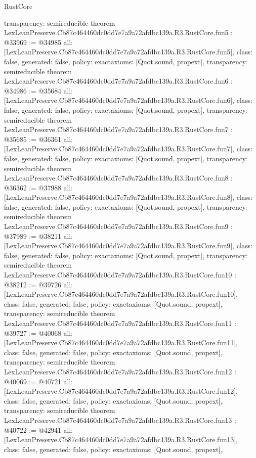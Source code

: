 \begin{lexlean}{RustCore}
\begin{coremodule}
{  transparency: semireducible
}
theorem LexLeanPreserve.Cb87c464460dc0dd7e7a9a72afdbc139a.R3.RustCore.fun5 : @33969 := @34985 {
  all: [LexLeanPreserve.Cb87c464460dc0dd7e7a9a72afdbc139a.R3.RustCore.fun5],
  class: false,
  generated: false,
  policy: exact{axioms: [Quot.sound, propext]},
  transparency: semireducible
}
theorem LexLeanPreserve.Cb87c464460dc0dd7e7a9a72afdbc139a.R3.RustCore.fun6 : @34986 := @35684 {
  all: [LexLeanPreserve.Cb87c464460dc0dd7e7a9a72afdbc139a.R3.RustCore.fun6],
  class: false,
  generated: false,
  policy: exact{axioms: [Quot.sound, propext]},
  transparency: semireducible
}
theorem LexLeanPreserve.Cb87c464460dc0dd7e7a9a72afdbc139a.R3.RustCore.fun7 : @35685 := @36361 {
  all: [LexLeanPreserve.Cb87c464460dc0dd7e7a9a72afdbc139a.R3.RustCore.fun7],
  class: false,
  generated: false,
  policy: exact{axioms: [Quot.sound, propext]},
  transparency: semireducible
}
theorem LexLeanPreserve.Cb87c464460dc0dd7e7a9a72afdbc139a.R3.RustCore.fun8 : @36362 := @37988 {
  all: [LexLeanPreserve.Cb87c464460dc0dd7e7a9a72afdbc139a.R3.RustCore.fun8],
  class: false,
  generated: false,
  policy: exact{axioms: [Quot.sound, propext]},
  transparency: semireducible
}
theorem LexLeanPreserve.Cb87c464460dc0dd7e7a9a72afdbc139a.R3.RustCore.fun9 : @37989 := @38211 {
  all: [LexLeanPreserve.Cb87c464460dc0dd7e7a9a72afdbc139a.R3.RustCore.fun9],
  class: false,
  generated: false,
  policy: exact{axioms: [Quot.sound, propext]},
  transparency: semireducible
}
theorem LexLeanPreserve.Cb87c464460dc0dd7e7a9a72afdbc139a.R3.RustCore.fun10 : @38212 := @39726 {
  all: [LexLeanPreserve.Cb87c464460dc0dd7e7a9a72afdbc139a.R3.RustCore.fun10],
  class: false,
  generated: false,
  policy: exact{axioms: [Quot.sound, propext]},
  transparency: semireducible
}
theorem LexLeanPreserve.Cb87c464460dc0dd7e7a9a72afdbc139a.R3.RustCore.fun11 : @39727 := @40068 {
  all: [LexLeanPreserve.Cb87c464460dc0dd7e7a9a72afdbc139a.R3.RustCore.fun11],
  class: false,
  generated: false,
  policy: exact{axioms: [Quot.sound, propext]},
  transparency: semireducible
}
theorem LexLeanPreserve.Cb87c464460dc0dd7e7a9a72afdbc139a.R3.RustCore.fun12 : @40069 := @40721 {
  all: [LexLeanPreserve.Cb87c464460dc0dd7e7a9a72afdbc139a.R3.RustCore.fun12],
  class: false,
  generated: false,
  policy: exact{axioms: [Quot.sound, propext]},
  transparency: semireducible
}
theorem LexLeanPreserve.Cb87c464460dc0dd7e7a9a72afdbc139a.R3.RustCore.fun13 : @40722 := @42941 {
  all: [LexLeanPreserve.Cb87c464460dc0dd7e7a9a72afdbc139a.R3.RustCore.fun13],
  class: false,
  generated: false,
  policy: exact{axioms: [Quot.sound, propext]},
}
\end{coremodule}
\end{lexlean}
